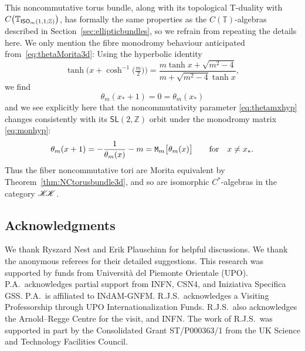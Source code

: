 \documentclass[10pt,a4paper]{amsart}
\numberwithin{equation}{section}
\newcommand{\Z}{\zed}
\newcommand{\CCK}{\mathscr{K}}
\newcommand{\sfSL}{\mathsf{SL}}
\newcommand{\ISO}{{\sf ISO}}
\newcommand{\zed}{{\mathbb Z}} %
\newcommand{\torus}{{\mathbb T}} %
\begin{document}
This noncommutative torus bundle, along with its topological T-duality with
$C\big(\torus_{\ISO_m(1,1;\Z)}\big)$, has formally the same properties
as the $C(\torus)$-algebras described in
Section~\ref{sec:ellipticbundles}, so
we refrain from repeating the details here. We only mention the
fibre monodromy behaviour anticipated from~\eqref{eq:thetaMorita3d}: Using the hyperbolic identity
\[
\tanh\big(x+\cosh^{-1}\big(\tfrac m2\big)\big) = \frac{m\tanh x+\sqrt{m^2-4}}{m+\sqrt{m^2-4} \tanh x} ,
\]
we find
\[
\theta_m(x_*+1)=0=\theta_m(x_*)
\]
and
we see explicitly here that the noncommutativity parameter \eqref{eq:thetamxhyp}
changes consistently with its $\sfSL(2,\Z)$ orbit under the monodromy
matrix \eqref{eq:monhyp}:
\[
\theta_m(x+1) = -\frac1{\theta_m(x)}-m = {\tt
 M}_m\big[\theta_m(x)\big] \qquad \mbox{for} \quad x\neq x_* .
\]
Thus the fiber noncommutative tori are Morita equivalent by
Theorem~\ref{thm:NCtorusbundle3d},
and so are isomorphic $C^*$-algebras in the category
$\CCK\hspace{-1mm}\CCK$.

\subsection*{Acknowledgments}

We thank Ryszard Nest and Erik Plauschinn for helpful
discussions. We thank the anonymous referees for their detailed suggestions. This research was supported by funds from Universit\`a del
Piemonte Orientale (UPO). P.A.\ acknowledges partial support from INFN,
CSN4, and Iniziativa Specifica GSS. P.A.\ is affiliated to INdAM-GNFM. R.J.S.\ acknowledges a Visiting
Professorship through UPO Internationalization Funds. R.J.S.\ also
acknowledges the Arnold--Regge Centre for the visit, and INFN. The work of R.J.S.\ was supported in
part by the Consolidated Grant ST/P000363/1 from the UK Science and
Technology Facilities Council.

\end{document}
